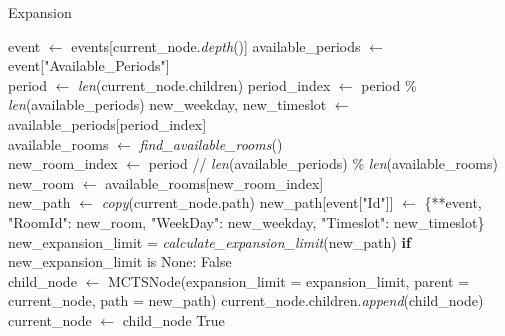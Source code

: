\begin{algorithm}
\caption{Expansion}\label{expansion}
\begin{algorithmic}[1]
    \State event $\gets$ events[current\_node.\textit{depth}()]
    \State available\_periods $\gets$ event["Available\_Periods"]
    \\
    \State period $\gets$ \textit{len}(current\_node.children)
    \State period\_index $\gets$ period \% \textit{len}(available\_periods)
    \State new\_weekday, new\_timeslot $\gets$ available\_periods[period\_index]
    \\
    \State available\_rooms $\gets$ \textit{find\_available\_rooms}()
    \\
    \State new\_room\_index $\gets$ period // \textit{len}(available\_periods) \% \textit{len}(available\_rooms)
    \State new\_room $\gets$ available\_rooms[new\_room\_index]
    \\
    \State new\_path $\gets$ \textit{copy}(current\_node.path)
    \State new\_path[event["Id"]] $\gets$ \{**event, "RoomId": new\_room, "WeekDay": new\_weekday, "Timeslot": new\_timeslot\}
    \\
    \State new\_expansion\_limit = \textit{calculate\_expansion\_limit}(new\_path)
    \State \textbf{if} new\_expansion\_limit is None: \Return False
    \\
    \State child\_node $\gets$ MCTSNode(expansion\_limit = expansion\_limit, parent = current\_node, path = new\_path)
    \State current\_node.children.\textit{append}(child\_node)
    \State current\_node $\gets$ child\_node
    \State \Return True
\EndProcedure
\end{algorithmic}
\end{algorithm}

